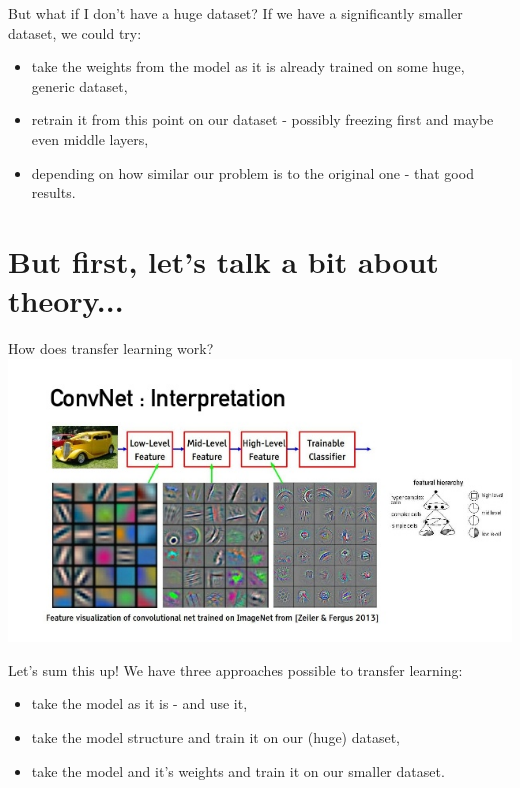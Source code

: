\documentclass[aspectratio=1610,english]{beamer} %
\begin{document}
 	\begin{frame}{But what if I don't have a huge dataset?}
 		If we have a significantly smaller dataset, we could try:
 		\begin{itemize}
		 	\item take the weights from the model as it is already trained on some huge, generic dataset,
		 	\item retrain it from this point on our dataset - possibly freezing first and maybe even middle layers,
		 	\item depending on how similar our problem is to the original one - that good results.
		 \end{itemize}
	\end{frame}

\section{But first, let's talk a bit about theory...}
  	\begin{frame}{How does transfer learning work?}
			 \includegraphics[scale=0.6]{images/interpr}
	 \end{frame}
  	\begin{frame}{Let's sum this up!}
		We have three approaches possible to transfer learning:
		 \begin{itemize}
		 	\item take the model as it is - and use it,
		 	\item take the model structure and train it on our (huge) dataset,
		 	\item take the model and it's weights and train it on our smaller dataset.
		 \end{itemize}
	\end{frame}
\end{document}
